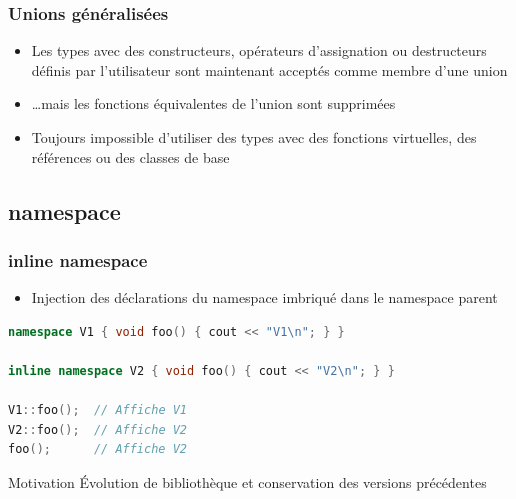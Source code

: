 \documentclass[C++.tex]{subfiles}
\begin{document}
\begin{frame}[fragile]
	\frametitle{Unions généralisées}
	\begin{itemize}
		\item Les types avec des constructeurs, opérateurs d'assignation ou destructeurs définis par l'utilisateur sont maintenant acceptés comme membre d'une union
		\item \ldots mais les fonctions équivalentes de l'union sont supprimées


		\item Toujours impossible d'utiliser des types avec des fonctions virtuelles, des références ou des classes de base
	\end{itemize}
\end{frame}

\subsection*{namespace}
\begin{frame}[fragile]
	\frametitle{inline namespace}
	\begin{itemize}
		\item Injection des déclarations du namespace imbriqué dans le namespace parent
	\end{itemize}

	\begin{lstlisting}[language=C++]
namespace V1 { void foo() { cout << "V1\n"; } }

inline namespace V2 { void foo() { cout << "V2\n"; } }

V1::foo();  // Affiche V1
V2::foo();  // Affiche V2
foo();      // Affiche V2\end{lstlisting}

	\begin{block}{Motivation}
		Évolution de bibliothèque et conservation des versions précédentes
	\end{block}
\end{frame}
\end{document}

